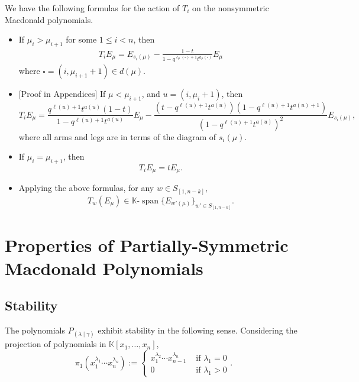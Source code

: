 \documentclass[ALCO]{cedram}
\newcommand{\Lq}{\mathbb{K}}
\newcommand{\Spann}{\text{-}\operatorname{span}}
\newcommand{\Sn}{S_{[1,n-k]}}
\newcommand{\PP}{P_{(\lambda \mid \gamma)}}
\newcommand{\dg}{d}
\begin{document}
\begin{lemm}\label{TiFormulas} We have the following formulas for the action of $T_i$ on the nonsymmetric Macdonald polynomials.
\begin{itemize} \item{} If $\mu_{i}>\mu_{i+1}$ for some $1\le i<n$, then
\begin{align}
\label{E:T-on-E-up}
T_i E_\mu = E_{s_i(\mu)}-\frac{1-t}{1-q^{\ell_\mu(\square)+1}t^{a_\mu(\square)}}E_\mu
\end{align}
where $\square=(i,\mu_{i+1}+1)\in\dg(\mu)$.\\

\item\hspace*{0mm}[Proof in Appendices] If $\mu < \mu_{i+1}$, and $u=(i,\mu_{i}+1)$, then
\begin{equation} \label{decreasingT} T_iE_\mu = \frac{q^{\ell(u)+1}t^{a(u)}(1-t)}{1-q^{\ell(u)+1}t^{a(u)}}E_{\mu} - \frac{(t-q^{\ell(u)+1}t^{a(u)})(1-q^{\ell(u)+1}t^{a(u)+1})}{(1-q^{\ell(u)+1}t^{a(u)})^2} E_{s_i(\mu)},\end{equation}
where all arms and legs are in terms of the diagram of $s_i(\mu)$.\\

\item If $\mu_i = \mu_{i+1}$, then
\begin{equation}\label{simpledz} T_i E_\mu = t E_\mu.\end{equation}

\item Applying the above formulas, for any $w\in \Sn$,
\begin{equation}\label{span}
    T_w(E_\mu) \in \Lq \Spann \{ E_{w'(\mu)} \}_{w' \in \Sn}.
\end{equation}

\end{itemize}
\end{lemm}








\section{Properties of Partially-Symmetric Macdonald Polynomials}
\subsection{Stability}
The polynomials $\PP$ exhibit stability in the following sense. Considering the projection of polynomials in $\mathbb{K}[x_1,\dotsc, x_n]$,
\[ \pi_1(x_1^{\lambda_1} \dotsm x_n^{\lambda_n}) := \begin{cases} x_1^{\lambda_2} \dotsm x_{n-1}^{\lambda_n} &\text{ if } \lambda_1=0\\
0 &\text{ if } \lambda_1 > 0\end{cases}. \]
\end{document}
